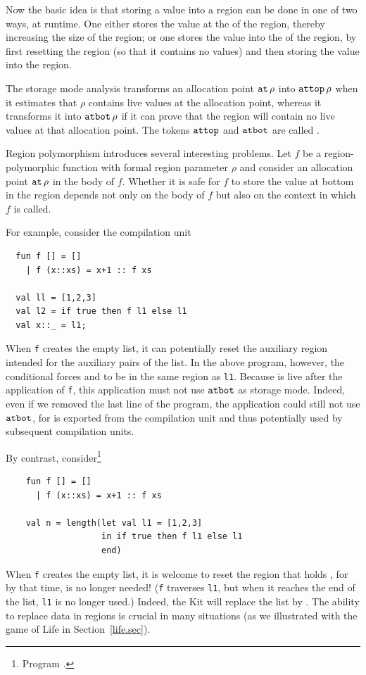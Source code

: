 \documentclass[12pt]{book}
\begin{document}
Now the basic idea is that storing a value into a region can be done
in one of two ways, at runtime. One either stores the value at the 
of the region, thereby increasing the size of the region; or one stores
the value into the  of the region, by first resetting the region
(so that it contains no values) and then storing the value into the region.

The storage mode analysis transforms an allocation point $\mathbin{\hbox{\tt at}}\,\rho$ into 
%
$\hbox{\tt attop}\,\rho$ when it estimates that $\rho$ contains live values at the allocation point, whereas it
transforms it into 
%
$\hbox{\tt atbot}\,\rho$ if it can prove that the region will contain no live
values at that allocation point. The tokens $\hbox{\tt attop}$ and $\hbox{\tt atbot}$ are
called .

%
Region polymorphism introduces several interesting problems. Let $f$ be
a region-polymorphic function with formal region parameter $\rho$ and
consider an allocation point $\mathbin{\hbox{\tt at}}\,\rho$ in the body of $f$.
Whether it is safe for $f$ to store the value at bottom in the region
depends not only on the body of $f$ but also on the context in which
$f$ is called.

For example, consider the compilation unit
\begin{verbatim}
  fun f [] = []
    | f (x::xs) = x+1 :: f xs

  val ll = [1,2,3]
  val l2 = if true then f l1 else l1
  val x::_ = l1;
\end{verbatim}
When {\tt f} creates the empty list, it can potentially reset the 
%
auxiliary region intended for the 
%
auxiliary pairs of the list. In the above program, however, the
conditional forces  and  to be in the same
region as {\tt l1}.  Because  is live after the application
of {\tt f}, this application must not use $\hbox{\tt atbot}$ as storage mode.
Indeed, even if we removed the last line of the program, the
application could still not use $\hbox{\tt atbot}$, for  is
exported from the compilation unit and thus potentially used by
subsequent compilation units.

By contrast, consider\footnote{Program .}
\begin{verbatim}
    fun f [] = []
      | f (x::xs) = x+1 :: f xs

    val n = length(let val l1 = [1,2,3]
                   in if true then f l1 else l1
                   end)
\end{verbatim}
When {\tt f} creates the empty list, it is welcome to reset the region that
holds , for by that time,  is
no longer needed! ({\tt f} traverses {\tt l1}, but when it reaches the
end of the list, {\tt l1} is no longer used.)  Indeed, the Kit will
replace the list \boxml{[1,2,3]} by \boxml{[2,3,4]}. The ability
to replace data in regions is crucial in many situations (as we
illustrated with the game of Life in Section~\ref{life.sec}).
\end{document}
